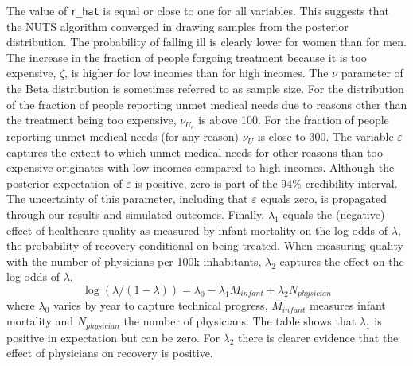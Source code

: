 \documentclass[a4paper,12pt]{article}
\begin{document}
The value of \texttt{r\_hat} is equal or close to one for all variables. This suggests that the NUTS algorithm converged in drawing samples from the posterior distribution. The probability of falling ill is clearly lower for women than for men. The increase in the fraction of people forgoing treatment because it is too expensive, \(\zeta\), is higher for low incomes than for high incomes. The \(\nu\) parameter of the Beta distribution is sometimes referred to as sample size. For the distribution of the fraction of people reporting unmet medical needs due to reasons other than the treatment being too expensive, \(\nu_{U_{o}}\) is above 100. For the fraction of people reporting unmet medical needs (for any reason) \(\nu_U\) is close to 300. The variable \(\varepsilon\) captures the extent to which unmet medical needs for other reasons than too expensive originates with low incomes compared to high incomes. Although the posterior expectation of \(\varepsilon\) is positive, zero is part of the 94\% credibility interval. The uncertainty of this parameter, including that \(\varepsilon\) equals zero, is propagated through our results and simulated outcomes. Finally, \(\lambda_1\) equals the (negative) effect of healthcare quality as measured by infant mortality on the log odds of \(\lambda\), the probability of recovery conditional on being treated. When measuring quality with the number of physicians per 100k inhabitants, \(\lambda_2\) captures the effect on the log odds of \(\lambda\).
\begin{equation}
\label{eq:lambda}
\log(\lambda/(1-\lambda)) = \lambda_0 - \lambda_1 M_{infant} + \lambda_2 N_{physician}
\end{equation}
where \(\lambda_0\) varies by year to capture technical progress, \(M_{infant}\) measures infant mortality and \(N_{physician}\) the number of physicians. The table shows that \(\lambda_1\) is positive in expectation but can be zero. For \(\lambda_2\) there is clearer evidence that the effect of physicians on recovery is positive.
\end{document}
